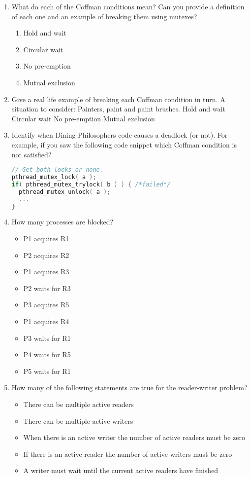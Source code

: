 \begin{enumerate}

\item What do each of the Coffman conditions mean? Can you provide a definition of each one and an example of breaking them using mutexes?

  \begin{enumerate}
  \item Hold and wait
  \item Circular wait
  \item No pre-emption
  \item Mutual exclusion
  \end{enumerate}

\item Give a real life example of breaking each Coffman condition in turn. A situation to consider: Painters, paint and paint brushes. Hold and wait Circular wait No pre-emption Mutual exclusion

\item Identify when Dining Philosophers code causes a deadlock (or not). For example, if you saw the following code snippet which Coffman condition is not satisfied?

\begin{lstlisting}[language=C]
// Get both locks or none.
pthread_mutex_lock( a );
if( pthread_mutex_trylock( b ) ) { /*failed*/
  pthread_mutex_unlock( a );
  ...
}
\end{lstlisting}

\item How many processes are blocked?

\begin{itemize}
\tightlist
\item
  P1 acquires R1
\item
  P2 acquires R2
\item
  P1 acquires R3
\item
  P2 waits for R3
\item
  P3 acquires R5
\item
  P1 acquires R4
\item
  P3 waits for R1
\item
  P4 waits for R5
\item
  P5 waits for R1
\end{itemize}

\item How many of the following statements are true for the reader-writer problem?

\begin{itemize}
\tightlist
\item
  There can be multiple active readers
\item
  There can be multiple active writers
\item
  When there is an active writer the number of active readers must be zero
\item
  If there is an active reader the number of active writers must be zero
\item
  A writer must wait until the current active readers have finished
\end{itemize}

\end{enumerate}

